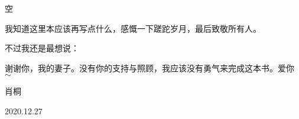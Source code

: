
%


\renewcommand\figurename{图}%


{\color{white} 空}
\vspace{1em}
\begin{center}
{\Huge {}}
\end{center}
\vspace{5em}

\begin{spacing}{1.18}

\parinterval 我知道这里本应该再写点什么，感慨一下蹉跎岁月，最后致敬所有人。

\vspace{1em}

\parinterval 不过我还是最想说：

\vspace{1em}

\parinterval 谢谢你，我的妻子。没有你的支持与照顾，我应该没有勇气来完成这本书。爱你 $\sim$

\vspace{8em}

\hfill 肖桐

\hfill 2020.12.27


\end{spacing}
